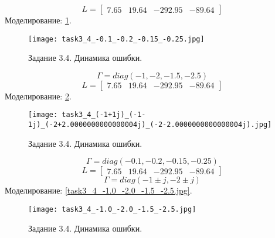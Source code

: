 \[L = \begin{bmatrix}
    7.65 &  19.64 & -292.95 & -89.64
  \end{bmatrix}\]
Моделирование: \ref{fig:task3_4_-0.1_-0.2_-0.15_-0.25.jpg}.
\begin{figure}[]
    \centering
    \texttt{[image: task3\_4\_-0.1\_-0.2\_-0.15\_-0.25.jpg]}
    \caption{Задание 3.4. Динамика ошибки.}
    \label{fig:task3_4_-0.1_-0.2_-0.15_-0.25.jpg}
\end{figure}

  \[\Gamma = diag(-1,-2,-1.5,-2.5)\]
  \[L = \begin{bmatrix}
    7.65 &  19.64 & -292.95 & -89.64
  \end{bmatrix}\]
  Моделирование: \ref{fig:task3_4_(-1+1j)_(-1-1j)_(-2+2.0000000000000004j)_(-2-2.0000000000000004j).jpg}.
  \begin{figure}[]
    \centering
    \texttt{[image: task3\_4\_(-1+1j)\_(-1-1j)\_(-2+2.0000000000000004j)\_(-2-2.0000000000000004j).jpg]}
    \caption{Задание 3.4. Динамика ошибки.}
    \label{fig:task3_4_(-1+1j)_(-1-1j)_(-2+2.0000000000000004j)_(-2-2.0000000000000004j).jpg}
\end{figure}


  \[\Gamma = diag(-0.1,-0.2,-0.15,-0.25)\]
  \[L = \begin{bmatrix}
    7.65 &  19.64 & -292.95 & -89.64
  \end{bmatrix}\]
  \[\Gamma = diag(-1\pm j, -2\pm j)\]
  Моделирование: \ref{task3_4_-1.0_-2.0_-1.5_-2.5.jpg}.

  \begin{figure}[]
    \centering
    \texttt{[image: task3\_4\_-1.0\_-2.0\_-1.5\_-2.5.jpg]}
    \caption{Задание 3.4. Динамика ошибки.}
    \label{fig:task3_4_-1.0_-2.0_-1.5_-2.5.jpg}
\end{figure}



